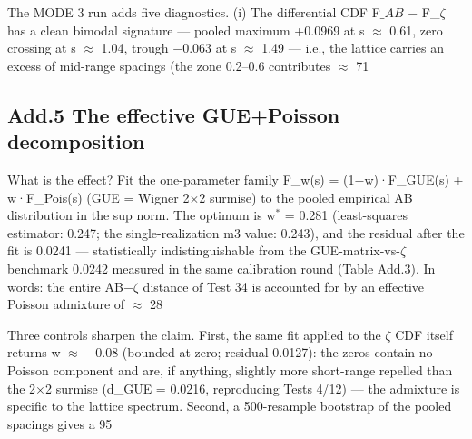 \documentclass[10pt]{article}
\begin{document}
The MODE 3 run adds five diagnostics. (i) The differential CDF F$\_{AB}$ $-$ F\_$\zeta$ has a clean bimodal signature --- pooled maximum +0.0969 at s $\approx$ 0.61, zero crossing at s $\approx$ 1.04, trough $-$0.063 at s $\approx$ 1.49 --- i.e., the lattice carries an excess of mid-range spacings (the zone 0.2--0.6 contributes $\approx$ 71%


\subsection{Add.5 The effective GUE+Poisson decomposition}


What is the effect? Fit the one-parameter family F\_w(s) = (1$-$w)·F\_GUE(s) + w·F\_Pois(s) (GUE = Wigner 2$\times$2 surmise) to the pooled empirical AB distribution in the sup norm. The optimum is w$^*$ = 0.281 (least-squares estimator: 0.247; the single-realization m3 value: 0.243), and the residual after the fit is 0.0241 --- statistically indistinguishable from the GUE-matrix-vs-$\zeta$ benchmark 0.0242 measured in the same calibration round (Table Add.3). In words: the entire AB$-$$\zeta$ distance of Test 34 is accounted for by an effective Poisson admixture of $\approx$ 28%


Three controls sharpen the claim. First, the same fit applied to the $\zeta$ CDF itself returns w $\approx$ $-$0.08 (bounded at zero; residual 0.0127): the zeros contain no Poisson component and are, if anything, slightly more short-range repelled than the 2$\times$2 surmise (d\_GUE = 0.0216, reproducing Tests 4/12) --- the admixture is specific to the lattice spectrum. Second, a 500-resample bootstrap of the pooled spacings gives a 95%
\end{document}
